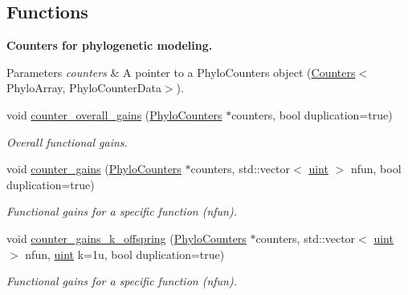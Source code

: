 \subsection*{Functions}
\begin{Indent}\textbf{ Counters for phylogenetic modeling.}\par
{\em 
\begin{DoxyParams}{Parameters}
{\em counters} & A pointer to a {\ttfamily Phylo\+Counters} object ({\ttfamily \hyperlink{classbarry_1_1_counters}{Counters}}$<${\ttfamily Phylo\+Array}, {\ttfamily Phylo\+Counter\+Data}$>$). \\
\hline
\end{DoxyParams}
}\begin{DoxyCompactItemize}
\item 
void \hyperlink{namespacebarry_1_1counters_1_1phylo_ae1e599324d656660ce8730b77efcbcce}{counter\+\_\+overall\+\_\+gains} (\hyperlink{namespacebarry_1_1counters_1_1phylo_a4e401ffe66d04091343dcffaf915f8c3}{Phylo\+Counters} $\ast$counters, bool duplication=true)
\begin{DoxyCompactList}\small\item\em Overall functional gains. \end{DoxyCompactList}\item 
void \hyperlink{namespacebarry_1_1counters_1_1phylo_afc1215e596c2f5a5e3b6f39273427a9a}{counter\+\_\+gains} (\hyperlink{namespacebarry_1_1counters_1_1phylo_a4e401ffe66d04091343dcffaf915f8c3}{Phylo\+Counters} $\ast$counters, std\+::vector$<$ \hyperlink{namespacebarry_a11dfc53ddb4672278319aa04f1e09a6c}{uint} $>$ nfun, bool duplication=true)
\begin{DoxyCompactList}\small\item\em Functional gains for a specific function ({\ttfamily nfun}). \end{DoxyCompactList}\item 
void \hyperlink{namespacebarry_1_1counters_1_1phylo_a1a2118168c3e375edf94fc6b53969a6b}{counter\+\_\+gains\+\_\+k\+\_\+offspring} (\hyperlink{namespacebarry_1_1counters_1_1phylo_a4e401ffe66d04091343dcffaf915f8c3}{Phylo\+Counters} $\ast$counters, std\+::vector$<$ \hyperlink{namespacebarry_a11dfc53ddb4672278319aa04f1e09a6c}{uint} $>$ nfun, \hyperlink{namespacebarry_a11dfc53ddb4672278319aa04f1e09a6c}{uint} k=1u, bool duplication=true)
\begin{DoxyCompactList}\small\item\em Functional gains for a specific function ({\ttfamily nfun}). \end{DoxyCompactList}\item 

\end{DoxyCompactItemize}
\end{Indent}
